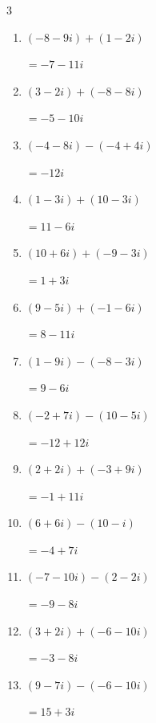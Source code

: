 \begin{multicols}{3}
\begin{enumerate}
        $\displaystyle =-4+13i$

  \item $\displaystyle (-8-9i) + (1-2i)$

        $\displaystyle =-7-11i$

  \item $\displaystyle (3-2i) + (-8-8i)$

        $\displaystyle =-5-10i$

\columnbreak %

  \item $\displaystyle (-4-8i) - (-4+4i)$

        $\displaystyle =-12i$

  \item $\displaystyle (1-3i) + (10-3i)$

        $\displaystyle =11-6i$

  \item $\displaystyle (10+6i) + (-9-3i)$

        $\displaystyle =1+3i$

  \item $\displaystyle (9-5i) + (-1-6i)$

        $\displaystyle =8-11i$

  \item $\displaystyle (1-9i) - (-8-3i)$

        $\displaystyle =9-6i$

  \item $\displaystyle (-2+7i) - (10-5i)$

        $\displaystyle =-12+12i$

  \item $\displaystyle (2+2i) + (-3+9i)$

        $\displaystyle =-1+11i$

  \item $\displaystyle (6+6i) - (10-i)$

        $\displaystyle =-4+7i$

  \item $\displaystyle (-7-10i) - (2-2i)$

        $\displaystyle =-9-8i$

  \item $\displaystyle (3+2i) + (-6-10i)$

        $\displaystyle =-3-8i$

  \item $\displaystyle (9-7i) - (-6-10i)$

        $\displaystyle =15+3i$


\end{enumerate}
\end{multicols}
